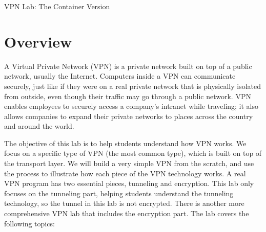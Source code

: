 
\newcommand{\commonfolder}{../../common-files}






\newcommand{\miniVPN}{{\tt MiniVPN}\xspace}
\newcommand{\vpnFigs}{./Figs}



\newcommand{\hostu}{{\tt U}\xspace}
\newcommand{\hostv}{{\tt V}\xspace}




\begin{center}
{\LARGE VPN Lab: The Container Version}
\end{center}





\section{Overview}

A Virtual Private Network (VPN) is a private network built on top of a
public network, usually the Internet. Computers inside a VPN can
communicate securely, just like if they were on a real private network that
is physically isolated from outside, even though their traffic may go
through a public network. VPN enables employees to securely access a
company's intranet while traveling; it also allows companies to expand
their private networks to places across the country and around the world.


The objective of this lab is to help students understand how 
VPN works. We focus on a specific type
of VPN (the most common type), which is built on top of the transport layer.
We will build a very simple VPN from the scratch, and use the process to 
illustrate how each piece of the VPN technology works. A real VPN 
program has two essential pieces, tunneling and encryption. This lab only 
focuses on the tunneling part, helping students understand the tunneling 
technology, so the tunnel in this lab is not encrypted. 
There is another more comprehensive VPN lab that includes the encryption part.
The lab covers the following topics:  

